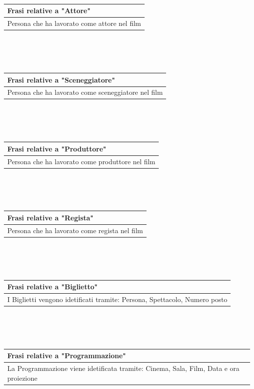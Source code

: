 \documentclass[10pt]{article}
\begin{document}
 	\\\\\\
 	\begin{tabular} { |p{16.8cm}| }
 		\hline
 		\rowcolor{lightgray}
 		\textbf{Frasi relative a "Attore"} \\
 		\hline
 		Persona che ha lavorato come attore nel film \\
 		\hline 		
 	\end{tabular} 
	\\\\\\
	\begin{tabular} { |p{16.8cm}| }
		\hline
		\rowcolor{lightgray}
		\textbf{Frasi relative a "Sceneggiatore"} \\
		\hline
		Persona che ha lavorato come sceneggiatore nel film \\
		\hline 		
	\end{tabular} 
	\\\\\\
	\begin{tabular} { |p{16.8cm}| }
		\hline
		\rowcolor{lightgray}
		\textbf{Frasi relative a "Produttore"} \\
		\hline
		Persona che ha lavorato come produttore nel film \\
		\hline 		
	\end{tabular} 
	\\\\\\
	\begin{tabular} { |p{16.8cm}| }
		\hline
		\rowcolor{lightgray}
		\textbf{Frasi relative a "Regista"} \\
		\hline
		Persona che ha lavorato come regista nel film \\
		\hline 		
	\end{tabular} 
	\\\\\\
	\begin{tabular} { |p{16.8cm}| }
		\hline
		\rowcolor{lightgray}
		\textbf{Frasi relative a "Biglietto"} \\
		\hline
		I Biglietti vengono idetificati tramite: Persona, Spettacolo, Numero posto \\
		\hline 		
	\end{tabular} 
	\\\\\\
	\begin{tabular} { |p{16.8cm}| }
		\hline
		\rowcolor{lightgray}
		\textbf{Frasi relative a "Programmazione"} \\
		\hline
		La Programmazione viene idetificata tramite: Cinema, Sala, Film, Data e ora proiezione \\
		\hline 		
	\end{tabular} 
	
\end{document}
